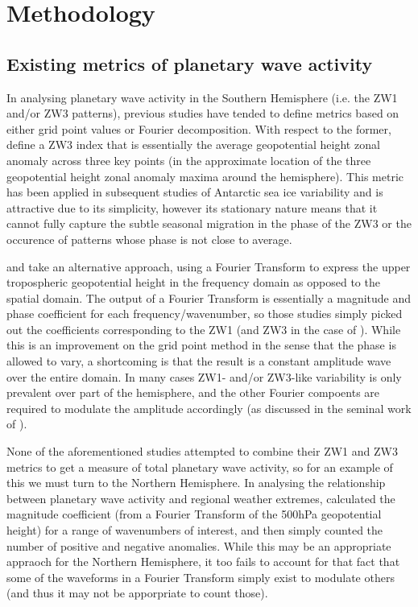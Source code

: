 \section{Methodology}\label{s:methodology}

\subsection{Existing metrics of planetary wave activity}\label{s:existing_metrics}

In analysing planetary wave activity in the Southern Hemisphere (i.e. the ZW1 and/or ZW3 patterns), previous studies have tended to define metrics based on either grid point values or Fourier decomposition. With respect to the former, \citet{Raphael2004} define a ZW3 index that is essentially the average geopotential height zonal anomaly across three key points (in the approximate location of the three geopotential height zonal anomaly maxima around the hemisphere). This metric has been applied in subsequent studies of Antarctic sea ice variability \citep{Raphael2007,Raphael2014} and is attractive due to its simplicity, however its stationary nature means that it cannot fully capture the subtle \citep[but not insignificant at around 15 degrees of longitude on average;][]{Raphael2004} seasonal migration in the phase of the ZW3 or the occurence of patterns whose phase is not close to average.

\citet{Hobbs2007} and \citet{Hobbs2010} take an alternative approach, using a Fourier Transform to express the upper tropospheric geopotential height in the frequency domain as opposed to the spatial domain. The output of a Fourier Transform is essentially a magnitude and phase coefficient for each frequency/wavenumber, so those studies simply picked out the coefficients corresponding to the ZW1 (and ZW3 in the case of \citet{Hobbs2010}). While this is an improvement on the grid point method in the sense that the phase is allowed to vary, a shortcoming is that the result is a constant amplitude wave over the entire domain. In many cases ZW1- and/or ZW3-like variability is only prevalent over part of the hemisphere, and the other Fourier compoents are required to modulate the amplitude accordingly (as discussed in the seminal work of \citet{vanLoon1972}).

None of the aforementioned studies attempted to combine their ZW1 and ZW3 metrics to get a measure of total planetary wave activity, so for an example of this we must turn to the Northern Hemisphere. In analysing the relationship between planetary wave activity and regional weather extremes, \citet{Screen2014} calculated the magnitude coefficient (from a Fourier Transform of the 500hPa geopotential height) for a range of wavenumbers of interest, and then simply counted the number of positive and negative anomalies. While this may be an appropriate appraoch for the Northern Hemisphere, it too fails to account for that fact that some of the waveforms in a Fourier Transform simply exist to modulate others (and thus it may not be apporpriate to count those).  
